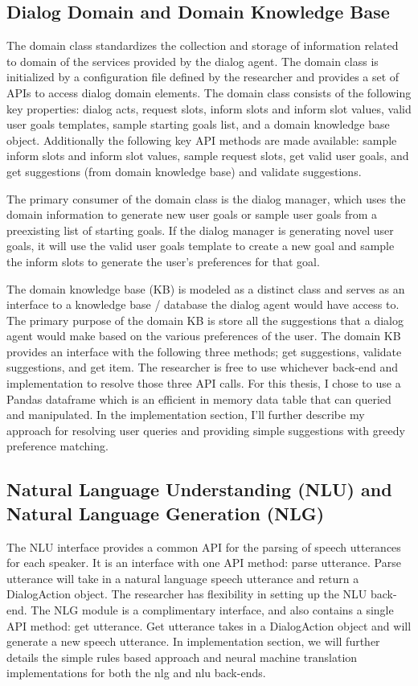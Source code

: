 \subsection{Dialog Domain and Domain Knowledge Base}

The domain class standardizes the collection and storage of information related to domain of the services provided by the dialog agent. The domain class is initialized by a configuration file defined by the researcher and provides a set of APIs to access dialog domain elements. The domain class consists of the following key properties: dialog acts, request slots, inform slots and inform slot values, valid user goals templates, sample starting goals list, and a domain knowledge base object.  Additionally the following key API methods are made available: sample inform slots and inform slot values, sample request slots, get valid user goals, and get suggestions (from domain knowledge base) and validate suggestions. 

The primary consumer of the domain class is the dialog manager, which uses the domain information to generate new user goals or sample user goals from a preexisting list of starting goals. If the dialog manager is generating novel user goals, it will use the valid user goals template to create a new goal and sample the inform slots to generate the user's preferences for that goal. 

The domain knowledge base (KB) is modeled as a distinct class and serves as an interface to a knowledge base / database the dialog agent would have access to. The primary purpose of the domain KB is store all the suggestions that a dialog agent would make based on the various preferences of the user. The domain KB provides an interface with the following three methods; get suggestions, validate suggestions, and get item. The researcher is free to use whichever back-end and implementation to resolve those three API calls. For this thesis, I chose to use a Pandas dataframe which is an efficient in memory data table that can queried and manipulated. In the implementation section, I'll further describe my approach for resolving user queries and providing simple suggestions with greedy preference matching. 

\subsection{Natural Language Understanding (NLU) and Natural Language Generation (NLG)}

The NLU interface provides a common API for the parsing of speech utterances for each speaker. It is an interface with one API method: parse utterance. Parse utterance will take in a natural language speech utterance and return a DialogAction object. The researcher has flexibility in setting up the NLU back-end. The NLG module is a complimentary interface, and also contains a single API method: get utterance. Get utterance takes in a DialogAction object and will generate a new speech utterance.  In implementation section, we will further details the simple rules based approach and neural machine translation implementations for both the nlg and nlu back-ends. 

